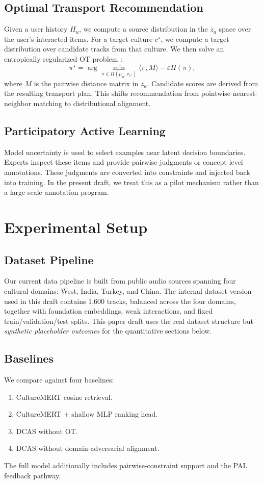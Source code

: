 \documentclass[10pt,twocolumn]{article}
\begin{document}
\subsection{Optimal Transport Recommendation}
Given a user history $H_u$, we compute a source distribution in the $z_a$ space over the user's interacted items.
For a target culture $c^\star$, we compute a target distribution over candidate tracks from that culture.
We then solve an entropically regularized OT problem \citep{cuturi2013sinkhorn}:
\begin{equation}
\pi^\star = \arg \min_{\pi \in \Pi(\mu_u,\nu_{c^\star})}
\langle \pi, M \rangle - \varepsilon H(\pi),
\end{equation}
where $M$ is the pairwise distance matrix in $z_a$.
Candidate scores are derived from the resulting transport plan.
This shifts recommendation from pointwise nearest-neighbor matching to distributional alignment.

\subsection{Participatory Active Learning}
Model uncertainty is used to select examples near latent decision boundaries.
Experts inspect these items and provide pairwise judgments or concept-level annotations.
These judgments are converted into constraints and injected back into training.
In the present draft, we treat this as a pilot mechanism rather than a large-scale annotation program.

\section{Experimental Setup}
\subsection{Dataset Pipeline}
Our current data pipeline is built from public audio sources spanning four cultural domains:
West, India, Turkey, and China.
The internal dataset version used in this draft contains 1{,}600 tracks, balanced across the four domains, together with foundation embeddings, weak interactions, and fixed train/validation/test splits.
This paper draft uses the real dataset structure but \emph{synthetic placeholder outcomes} for the quantitative sections below.

\subsection{Baselines}
We compare against four baselines:
\begin{enumerate}
\item CultureMERT cosine retrieval.
\item CultureMERT + shallow MLP ranking head.
\item DCAS without OT.
\item DCAS without domain-adversarial alignment.
\end{enumerate}
The full model additionally includes pairwise-constraint support and the PAL feedback pathway.
\end{document}

